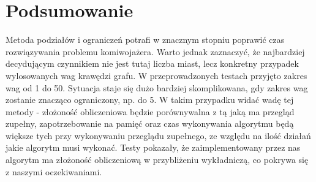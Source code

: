\documentclass{article}
\begin{document}
\section{Podsumowanie}
\par	
	Metoda podziałów i ograniczeń potrafi w znacznym stopniu poprawić czas rozwiązywania problemu komiwojażera. Warto jednak zaznaczyć, że najbardziej decydującym czynnikiem nie jest tutaj liczba miast, lecz konkretny przypadek wylosowanych wag krawędzi grafu. W przeprowadzonych testach przyjęto zakres wag od 1 do 50. Sytuacja staje się dużo bardziej skomplikowana, gdy zakres wag zostanie znacząco ograniczony, np.  do 5. W takim przypadku widać wadę tej metody - złożoność obliczeniowa będzie porównywalna z tą jaką ma przegląd zupełny, zapotrzebowanie na pamięć oraz czas wykonywania algorytmu będą większe tych przy wykonywaniu przeglądu zupełnego, ze względu na ilość działań jakie algorytm musi wykonać. Testy pokazały, że zaimplementowany przez nas algorytm ma złożoność obliczeniową w przybliżeniu wykładniczą, co pokrywa się z naszymi oczekiwaniami.
	





%
%	
%

\end{document}
